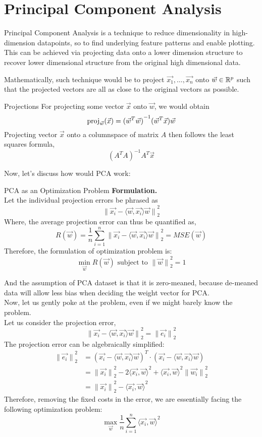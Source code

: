 \section{Principal Component Analysis}
Principal Component Analysis is a technique to reduce dimensionality in high-dimension datapoints, so to find underlying feature patterns and enable plotting.
This can be achieved via projecting data onto a lower dimension structure to recover lower dimensional structure from the original high dimensional data.
\par
Mathematically, such technique would be to project $\vec{x_1}, \dots, \vec{x_n}$ onto $\vec{w} \in \mathbb{R}^p$ such that the projected vectors are all as close to the original vectors as possible.
\begin{ln-explain}{Projections}{}
    For projecting some vector $\vec{x}$ onto $\vec{w}$, we would obtain
    \[
        \text{proj}_{\vec{w}}(\vec{x}) = {(\vec{w}^T \vec{w})}^{-1} (\vec{w}^T \vec{x}) \vec{w}
    \]
    Projecting vector $\vec{x}$ onto a columnspace of matrix $A$ then follows the least squares formula,
    \[
        {(A^T A)}^{-1} A^T \vec{x}
    \]
\end{ln-explain}
Now, let's discuss how would PCA work:
\begin{ln-explain}{PCA as an Optimization Problem}{}
    \textbf{Formulation.} \\
    Let the individual projection errors be phrased as
    \[{\lVert \vec{x_i} - \langle \vec{w}, \vec{x_i} \rangle \vec{w} \rVert}_2^2\]
    Where, the average projection error can thus be quantified as,
    \[
        R(\vec{w}) = \frac{1}{n} \sum_{i = 1}^n {\lVert \vec{x_i} - \langle \vec{w}, \vec{x_i} \rangle \vec{w} \rVert}_2^2 = MSE(\vec{w})
    \]
    Therefore, the formulation of optimization problem is:
    \[
        \min_{\vec{w}} R(\vec{w}) \text{ subject to } {\lVert \vec{w} \rVert}_2^2 = 1
    \]
\end{ln-explain}
And the assumption of PCA dataset is that it is zero-meaned, because de-meaned data will allow less bias when deciding the weight vector for PCA. \\
Now, let us gently poke at the problem, even if we might barely know the problem. \\
Let us consider the projection error,
\[
    {\lVert \vec{x_i} - \langle \vec{w}, \vec{x_i} \rangle \vec{w} \rVert}_2^2 = {\lVert \vec{e_i} \rVert}_2^2
\]
The projection error can be algebraically simplified:
\begin{align*}
    {\lVert \vec{e_i} \rVert}_2^2
    &= {(\vec{x_i} - \langle \vec{w}, \vec{x_i} \rangle \vec{w})}^T \cdot (\vec{x_i} - \langle \vec{w}, \vec{x_i} \rangle \vec{w}) \\
    &= {\lVert \vec{x_i} \rVert}_2^2 - 2 {\langle \vec{x_i}, \vec{w} \rangle}^2 + {\langle \vec{x_i}, \vec{w} \rangle}^2 {\lVert \vec{w_i} \rVert}_2^2 \\
    &= {\lVert \vec{x_i} \rVert}_2^2 - {\langle \vec{x_i}, \vec{w} \rangle}^2
\end{align*}
Therefore, removing the fixed costs in the error, we are essentially facing the following optimization problem:
\[
    \max_{\vec{w}} \frac{1}{n} \sum_{i = 1}^n {\langle \vec{x_i}, \vec{w} \rangle}^2
\]
